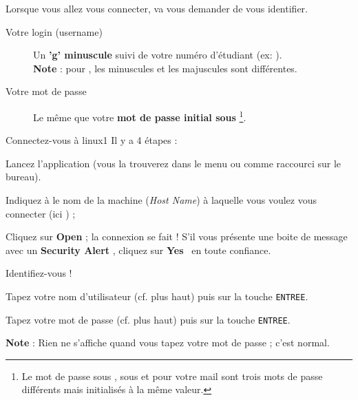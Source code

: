 \documentclass[a4paper,11pt]{style-esi/td}
\begin{document}
		\bigskip
		Lorsque vous allez vous connecter,  va vous demander de vous identifier.

		\begin{infobox}
			\begin{description}
			\item[Votre login (username)]
				Un \textbf{'g' minuscule} suivi de votre numéro d'étudiant
				(ex: ).
				\\\textbf{Note} : pour , les minuscules et les majuscules 
				sont différentes.
			\item[Votre mot de passe]
				Le même que votre \textbf{mot de passe initial sous }%
				\footnote{%
					Le mot de passe sous ,
					sous  et pour votre mail  
					sont trois mots de passe différents
					mais initialisés à la même valeur.        
				}.			
			\end{description}
		\end{infobox}

		\begin{Tutoriel}{Connectez-vous à linux1} 
		Il y a 4 étapes :
		\begin{steps}			
		\item 
			Lancez l'application  
			(vous la trouverez dans le menu ou comme raccourci sur le bureau).			
		\item 
			Indiquez à  le nom de la machine (\textit{Host Name}) 
			à laquelle vous voulez vous connecter (ici ) ;
		\item 
			Cliquez sur \og \textbf{Open} \fg ; 
			la connexion se fait ! 
			S'il vous présente une boite de message avec un \og \textbf{Security Alert} \fg, 
			cliquez sur \og \textbf{Yes} \fg\ en toute confiance.			
		\item 
			Identifiez-vous !
			\begin{steps}
			\item 
				Tapez votre nom d'utilisateur (cf. plus haut) 
				puis sur la touche \verb_ENTREE_. 
			\item 
				Tapez votre mot de passe (cf. plus haut) puis sur la touche \verb_ENTREE_.
				\par
				\textbf{Note} : Rien ne s'affiche quand vous tapez votre mot de passe ; c'est normal.
			\end{steps}
		\end{steps}
		\end{Tutoriel}

\newpage
\end{document}
